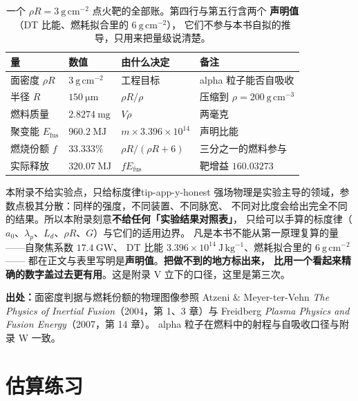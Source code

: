 \begin{table}[htbp]
\centering
\small
\caption{一个 $\rho R = 3\ \mathrm{g\,cm^{-2}}$ 点火靶的全部账。第四行与第五行含两个
\textbf{声明值}（DT 比能、燃耗拟合里的 $6\ \mathrm{g\,cm^{-2}}$），
它们不参与本书自拟的推导，只用来把量级说清楚。}
\label{tab:app-y-icf}
\begin{tabular}{p{3.2cm}p{3.2cm}p{3.4cm}p{3.4cm}}
\toprule
量 & 数值 & 由什么决定 & 备注 \\
\midrule
面密度 $\rho R$ & $3\ \mathrm{g\,cm^{-2}}$ & 工程目标 & alpha 粒子能否自吸收 \\
半径 $R$ & $150\ \mathrm{\mu m}$ & $\rho R/\rho$ & 压缩到 $\rho = 200\ \mathrm{g\,cm^{-3}}$ \\
燃料质量 & $2.8274\ \mathrm{mg}$ & $V\rho$ & 两毫克 \\
聚变能 $E_{\mathrm{fus}}$ & $960.2\ \mathrm{MJ}$ & $m\times3.396\times10^{14}$ & 声明比能 \\
燃烧份额 $f$ & $33.333\%$ & $\rho R/(\rho R+6)$ & 三分之一的燃料参与 \\
实际释放 & $320.07\ \mathrm{MJ}$ & $fE_{\mathrm{fus}}$ & 靶增益 $160.03273$ \\
\bottomrule
\end{tabular}

\end{table}

\begin{tip}{本附录不给实验点，只给标度律}{tip-app-y-honest}
强场物理是实验主导的领域，参数点极其分散：同样的强度，不同装置、不同脉宽、
不同对比度会给出完全不同的结果。所以本附录刻意\textbf{不给任何「实验结果对照表」}，
只给可以手算的标度律（$a_0$、$\lambda_p$、$L_d$、$\rho R$、$G$）与它们的适用边界。
凡是本书不能从第一原理复算的量——自聚焦系数 $17.4\ \mathrm{GW}$、
DT 比能 $3.396\times10^{14}\ \mathrm{J\,kg^{-1}}$、燃耗拟合里的 $6\ \mathrm{g\,cm^{-2}}$——
都在正文与表里写明是\textbf{声明值}。\textbf{把做不到的地方标出来，
比用一个看起来精确的数字盖过去更有用}。这是附录 V 立下的口径，这里是第三次。
\end{tip}

{\footnotesize
\textbf{出处：}面密度判据与燃耗份额的物理图像参照 Atzeni \& Meyer-ter-Vehn
\emph{The Physics of Inertial Fusion}（2004，第 1、3 章）与 Freidberg
\emph{Plasma Physics and Fusion Energy}（2007，第 14 章）。
alpha 粒子在燃料中的射程与自吸收口径与附录 W 一致。
}

\section{估算练习}
\label{sec:app-y-problems}

